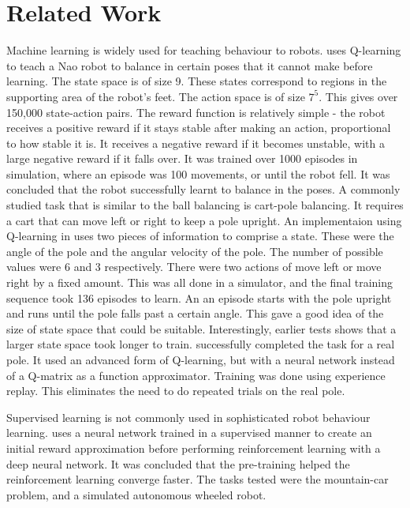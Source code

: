 \documentclass[12pt,a4paper]{article}
\begin{document}
\section{Related Work}
Machine learning is widely used for teaching behaviour to robots. \cite{nao_balance} uses Q-learning to teach a Nao robot to balance in certain poses that it cannot make before learning. The state space is of size 9. These states correspond to regions in the supporting area of the robot's feet. The action space is of size $7^5$. This gives over 150,000 state-action pairs. The reward function is relatively simple - the robot receives a positive reward if it stays stable after making an action, proportional to how stable it is. It receives a negative reward if it becomes unstable, with a large negative reward if it falls over. It was trained over 1000 episodes in simulation, where an episode was 100 movements, or until the robot fell. It was concluded that the robot successfully learnt to balance in the poses. A commonly studied task that is similar to the ball balancing is cart-pole balancing. It requires a cart that can move left or right to keep a pole upright. An implementaion using Q-learning in \cite{cart_pole_webpage} uses two pieces of information to comprise a state. These were the angle of the pole and the angular velocity of the pole. The number of possible values were 6 and 3 respectively. There were two actions of move left or move right by a fixed amount. This was all done in a simulator, and the final training sequence took 136 episodes to learn. An an episode starts with the pole upright and runs until the pole falls past a certain angle. This gave a good idea of the size of state space that could be suitable. Interestingly, earlier tests shows that a larger state space took longer to train. \cite{real_pole} successfully completed the task for a real pole. It used an advanced form of Q-learning, but with a neural network instead of a Q-matrix as a function approximator. Training was done using experience replay. This eliminates the need to do repeated trials on the real pole.

Supervised learning is not commonly used in sophisticated robot behaviour learning. \cite{nn_then_dnn} uses a neural network trained in a supervised manner to create an initial reward approximation before performing reinforcement learning with a deep neural network. It was concluded that the pre-training helped the reinforcement learning converge faster. The tasks tested were the mountain-car problem, and a simulated autonomous wheeled robot.
\end{document}
